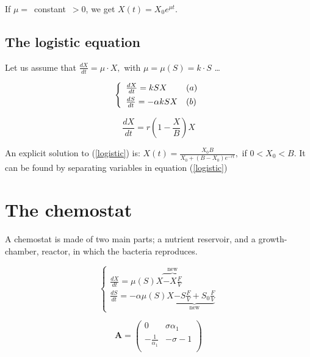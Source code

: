 \documentclass[a4paper, 10pt, twoside, openright]{book}
\begin{document}
If \mbox{$\mu =$ constant $>0$,} we get $X(t)={X}_0
{e}^{\mu t}$.

\subsection{The logistic equation}

Let us assume that $\frac{dX}{dt}=\mu \cdot X,$ with
$\mu=\mu(S)=k\cdot S$ \ldots 

\begin{displaymath}
\left\{ \begin{array}{ll}
\frac{dX}{dt}=kSX                            & (a) \\
\frac{dS}{dt}=- \alpha kSX \rule{0pt}{3ex}   & (b) 
\end{array}\right.
\end{displaymath}

\begin{equation} \label{logistic}
\frac{dX}{dt}= r(1- \frac{X}{B})X  
\end{equation}

An explicit solution to (\ref{logistic}) is: 
$X(t)=\frac{{X}_{0}B}{{X}_{0}+(B-{X}_{0}){e}^{-rt}},$ if $0<{X}_{0}<B$. 
It can be found by separating variables in equation (\ref{logistic})


\section{The chemostat} 

A chemostat is made of two main parts; a nutrient reservoir, and a
growth-chamber, reactor, in which the bacteria reproduces. 

\begin{equation} \label{chemo_basic}
\left\{ \begin{array}{l}
\frac{dX}{dt}= \mu(S)X \overbrace{-X\frac{F}{V}}^{\textrm{new}}  \\
\frac{dS}{dt}=- \alpha \mu(S) X
\underbrace{-S\frac{F}{V}+ {S}_{0}\frac{F}{V}}_{\textrm{new}} 
\end{array}\right.
\end{equation}

\begin{displaymath}
\mathbf{A} =
\left( \begin{array}{cc}
0 &  \sigma {\alpha}_{1}  \\
 - \frac{1}{{\alpha}_{1}} & -\sigma - 1 \\
\end{array}\right)
\end{displaymath}
\end{document}
